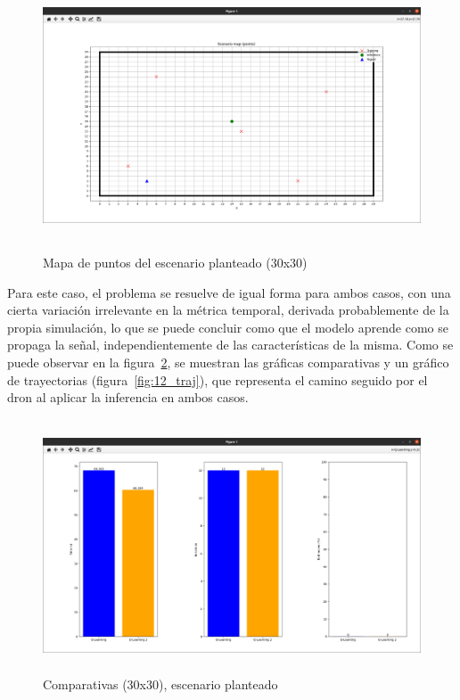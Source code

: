 \begin{figure} [t]
    \begin{center}
    \includegraphics[height=8cm]{imagenes/cap4/25_mapa_p_diff.png}
    \end{center}
    \caption[Mapa de puntos del escenario planteado (30x30)]{Mapa de puntos del escenario planteado (30x30)}
    \label{fig:map_p_diff_30}
\end{figure}

Para este caso, el problema se resuelve de igual forma para ambos casos, con una cierta variación irrelevante en la métrica temporal, derivada probablemente de la propia simulación, lo que se puede concluir como que el modelo aprende como se propaga la señal, independientemente de las características de la misma. Como se puede observar en la figura~\ref{fig:comp_diff_30}, se muestran las gráficas comparativas y un gráfico de trayectorias (figura~\ref{fig:12_traj}), que representa el camino seguido por el dron al aplicar la inferencia en ambos casos.\\

\begin{figure} [t]
    \begin{center}
    \includegraphics[height=7.5cm]{imagenes/cap4/26_comp_diff.png}
    \end{center}
    \caption[Comparativas (30x30), escenario planteado]{Comparativas (30x30), escenario planteado}
    \label{fig:comp_diff_30}
\end{figure}

